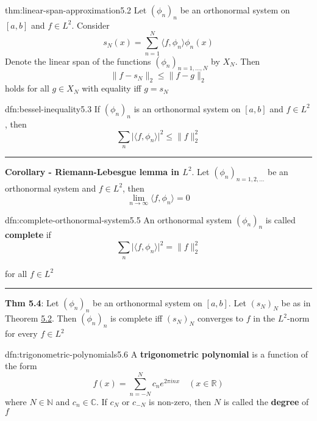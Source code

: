 \documentclass[landscape, 8pt]{extarticle}
\begin{document}
\begin{multicols}{3}
\newpage
\begin{thm}[]{thm:linear-span-approximation}{5.2}
	Let $(\phi_{n})_{n}$ be an orthonormal system on $[a, b]$ and $f\in L^{2}$. Consider
	\[s_{N}(x) = \sum_{n = 1}^{N}\langle f, \phi_{n} \rangle \phi_{n}(x)\]
	Denote the linear span of the functions $(\phi_{n})_{n=1,\dots,N}$ by $X_{N}$. Then
	\[\lVert f - s_{N} \rVert_{2} \le \lVert f - g \rVert_{2}\]
	holds for all $g\in X_{N}$ with equality iff $g = s_{N}$
\end{thm}

\vspace{-5pt}
\begin{dfn}{dfn:bessel-inequality}{5.3}
	\vspace{-5pt}
	If $(\phi_{n})_{n}$ is an orthonormal system on $[a,b]$ and $f\in L^{2}$, then
	\[\sum_{n} \lvert \langle f, \phi_{n} \rangle \rvert^{2} \le \lVert f \rVert^{2}_{2}\]

	\noindent\rule{\textwidth}{0.2pt}
	\textbf{Corollary - Riemann-Lebesgue lemma in $L^{2}$}. Let $(\phi_{n})_{n=1,2,\dots}$ be an orthonormal system and $f\in L^{2}$, then
	\[\lim_{n\to \infty}\langle f, \phi_{n} \rangle = 0\]
\end{dfn}

\vspace{-5pt}
\begin{dfn}{dfn:complete-orthonormal-system}{5.5}
	\vspace{-5pt}
	An orthonormal system $(\phi_{n})_{n}$ is called \textbf{complete} if
	\[\sum_{n} \lvert \langle f, \phi_{n} \rangle \rvert^{2} = \lVert f \rVert^{2}_{2}\]

	\vspace{-2pt}
	for all $f\in L^{2}$
	
	\vspace{-5pt}
	\noindent\rule{\textwidth}{0.2pt}
	\textbf{Thm 5.4}: Let $(\phi_{n})_{n}$ be an orthonormal system on $[a, b]$. Let $(s_{N})_{N}$ be as in Theorem \hyperref[dfn:inner-prod]{5.2}. Then $(\phi_{n})_{n}$ is complete iff $(s_{N})_{N}$ converges to $f$ in the $L^{2}$-norm for every $f\in L^{2}$
\end{dfn}

\vspace{-5pt}
\begin{dfn}{dfn:trigonometric-polynomials}{5.6}
	A \textbf{trigonometric polynomial} is a function of the form
	\[f(x) = \sum_{n = -N}^{N} c_{n} e^{2 \pi inx} \quad (x\in\mathbb{R})\]
	where $N\in\mathbb{N}$ and $c_{n}\in\mathbb{C}$. If $c_{N}$ or $c_{-N}$ is non-zero, then $N$ is called the \textbf{degree} of $f$


\end{dfn}
\end{multicols}
\end{document}
